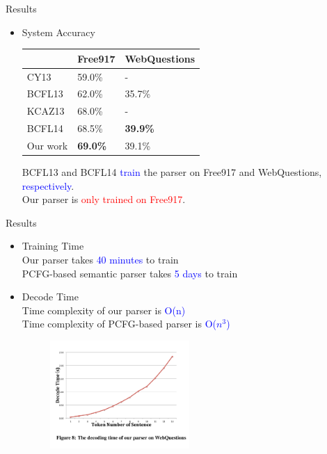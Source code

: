 \documentclass{beamer}
\begin{document}
\begin{frame}{Results}
	\begin{itemize}
			\item System Accuracy
			\begin{table}
			\small
			\centering
			\begin{tabular}{|l|l|l|}
			\hline
 			& Free917 & WebQuestions\\
			\hline
			CY13 & 59.0\% &	 - \\
			BCFL13 & 62.0\% & 35.7\%	\\
			KCAZ13 & 68.0\% & -	\\
			BCFL14 & 68.5\% & \textbf{39.9\%}	\\
			Our work& \textbf{69.0\%} & 39.1\% \\
			\hline
			\end{tabular}
			\label{tab:results}
			\end{table}
			\small BCFL13 and BCFL14 \textcolor{blue}{train} the parser on Free917 and WebQuestions, \textcolor{blue}{respectively}. \\
			\small Our parser is  \textcolor{red}{only trained on Free917}.
	\end{itemize}
\end{frame}

\begin{frame}{Results}
	\begin{itemize}
		\item Training Time \\
			Our parser takes \textcolor{blue}{40 minutes} to train \\
			PCFG-based semantic parser takes \textcolor{blue}{5 days} to train
		\item Decode Time \\
		Time complexity of our parser is \textcolor{blue}{O(n)} \\
		Time complexity of PCFG-based parser is \textcolor{blue}{O($n^3$)}
		\begin{figure}
			\centering\includegraphics[width=0.5\textwidth]{introduction/decode_time.pdf}
		\end{figure}
	\end{itemize}
\end{frame}
\end{document}
